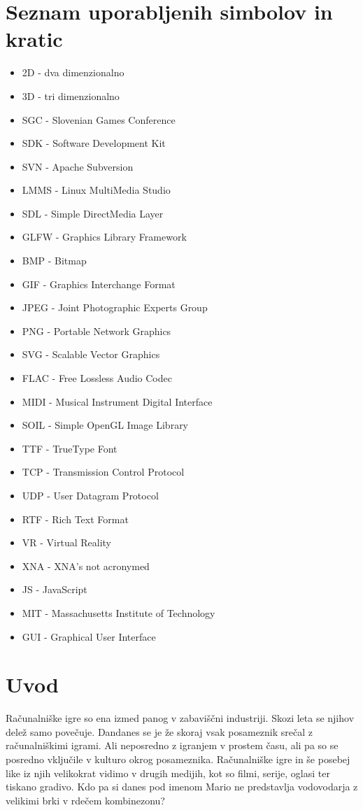 \documentclass[12pt,a4paper,twoside]{book}
\begin{document}
\chapter*{Seznam uporabljenih simbolov in kratic}\thispagestyle{fancy}
\begin{itemize}
	\item 2D - dva dimenzionalno
	\item 3D - tri dimenzionalno
	\item SGC - Slovenian Games Conference
	\item SDK - Software Development Kit
	\item SVN - Apache Subversion
	\item LMMS - Linux MultiMedia Studio
	\item SDL - Simple DirectMedia Layer
	\item GLFW - Graphics Library Framework
	\item BMP - Bitmap
	\item GIF - Graphics Interchange Format
	\item JPEG - Joint Photographic Experts Group
	\item PNG - Portable Network Graphics
	\item SVG - Scalable Vector Graphics
	\item FLAC - Free Lossless Audio Codec
	\item MIDI - Musical Instrument Digital Interface
	\item SOIL - Simple OpenGL Image Library
	\item TTF - TrueType Font
	\item TCP - Transmission Control Protocol
	\item UDP - User Datagram Protocol
	\item RTF - Rich Text Format
	\item VR - Virtual Reality
	\item XNA - XNA's not acronymed
	\item JS - JavaScript
	\item MIT - Massachusetts Institute of Technology
	\item GUI - Graphical User Interface
\end{itemize}
\chapter{Uvod}\thispagestyle{fancy}
\setcounter{page}{1}

Računalniške igre so ena izmed panog v zabaviščni industriji. Skozi leta se njihov delež samo povečuje. Dandanes se je že skoraj vsak posameznik srečal z računalniškimi igrami. Ali neposredno z igranjem v prostem času, ali pa so se posredno vključile v kulturo okrog posameznika. Računalniške igre in še posebej like iz njih velikokrat vidimo v drugih medijih, kot so filmi, serije, oglasi ter tiskano gradivo. Kdo pa si danes pod imenom Mario ne predstavlja vodovodarja z velikimi brki v rdečem kombinezonu?
\end{document}
